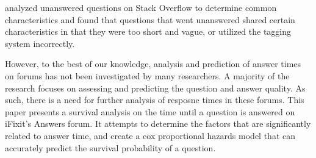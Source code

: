 \documentclass[12pt]{article}
\begin{document}
    \citep{Asaduzzaman2013} analyzed unanswered questions on Stack Overflow to determine common characteristics and found that questions that went unanswered shared certain characteristics in that they were too short and vague, or utilized the tagging system incorrectly. 

    However, to the best of our knowledge, analysis and prediction of answer times on forums has not been investigated by many researchers. A majority of the research focuses on assessing and predicting the question and answer quality. As such, there is a need for further analysis of resposne times in these forums. This paper presents a survival analysis on the time until a question is answered on iFixit's Answers forum. It attempts to determine the factors that are significantly related to answer time, and create a cox proportional hazards model that can accurately predict the survival probability of a question. 




\end{document}
